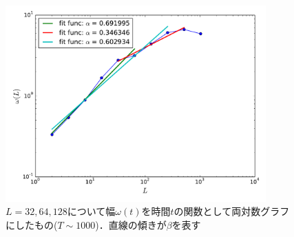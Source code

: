\documentclass{jsarticle}
\begin{document}
\begin{enumerate}
\begin{enumerate}
                \begin{figure}[H]
                    \begin{center}
                        \includegraphics[width=10.0cm]{figure_4.pdf}
                        \caption{$L=32,64,128$について幅$\omega(t)$を時間$t$の関数として両対数グラフにしたもの($T \sim 1000$)．直線の傾きが$\beta$を表す}
                        \label{fig:14-12-f4}
                    \end{center}
                \end{figure}
                
            \end{enumerate}
        

\end{enumerate}
\end{document}
